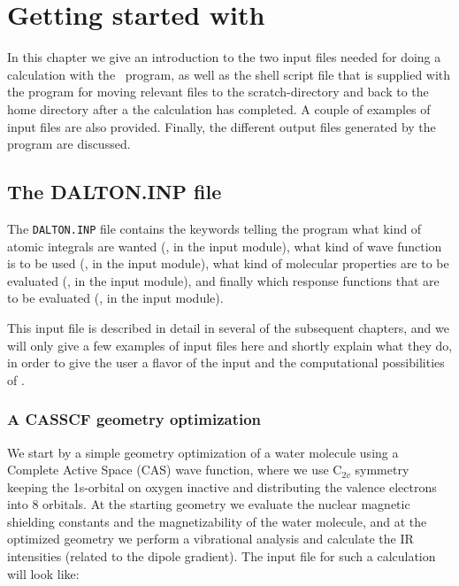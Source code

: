 \chapter{Getting started with \siraba }\label{ch:starting}

In this chapter we give an introduction to the two input files needed
for doing a calculation with the \siraba\ program, as well as the
shell script file that is supplied with the program for moving
relevant files to the scratch-directory and back to the home directory
after a the calculation has completed. A couple of examples of
input files  are also provided. Finally, the different output files
generated by the program are discussed.

\section{The DALTON.INP file}\label{sec:daltoninp}

The \verb|DALTON.INP| file contains the keywords telling the program
what kind of atomic integrals are wanted (\her , in the
 input module), what kind of wave
function is to be used (\sir , in the  input 
module), what kind of molecular properties  are 
to be evaluated (\aba , in the  input module), and
finally which response functions that are to
be evaluated (\resp , in 
the  input module).

This input file is described in detail in several of the subsequent chapters,
and we will  only give a few examples of input files here and shortly
explain what they do, in order to give the user a flavor of the input
and the computational possibilities 
of \siraba . 

\subsection{A CASSCF geometry optimization}

We start by a simple geometry optimization of a water molecule using a Complete 
Active Space (CAS) wave function, where we use C$_{2v}$ symmetry
keeping the 1s-orbital on oxygen inactive and distributing the valence
electrons  into 8 orbitals. At the starting geometry we
evaluate the nuclear magnetic shielding constants and the 
magnetizability of the water 
molecule, and at the optimized geometry we perform a vibrational
analysis and calculate the IR
intensities (related to the dipole 
gradient). The input file for such a calculation will look like:

